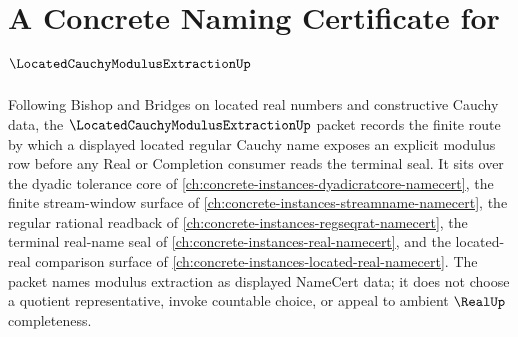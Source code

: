 \chapter{A Concrete Naming Certificate for $\LocatedCauchyModulusExtractionUp$}
\label{ch:concrete-instances-located-cauchy-modulus-extraction-namecert}

Following Bishop and Bridges on located real numbers and constructive Cauchy data, the $\LocatedCauchyModulusExtractionUp$ packet records the finite route by which a displayed located regular Cauchy name exposes an explicit modulus row before any Real or Completion consumer reads the terminal seal. It sits over the dyadic tolerance core of \autoref{ch:concrete-instances-dyadicratcore-namecert}, the finite stream-window surface of \autoref{ch:concrete-instances-streamname-namecert}, the regular rational readback of \autoref{ch:concrete-instances-regseqrat-namecert}, the terminal real-name seal of \autoref{ch:concrete-instances-real-namecert}, and the located-real comparison surface of \autoref{ch:concrete-instances-located-real-namecert}. The packet names modulus extraction as displayed NameCert data; it does not choose a quotient representative, invoke countable choice, or appeal to ambient $\RealUp$ completeness.

